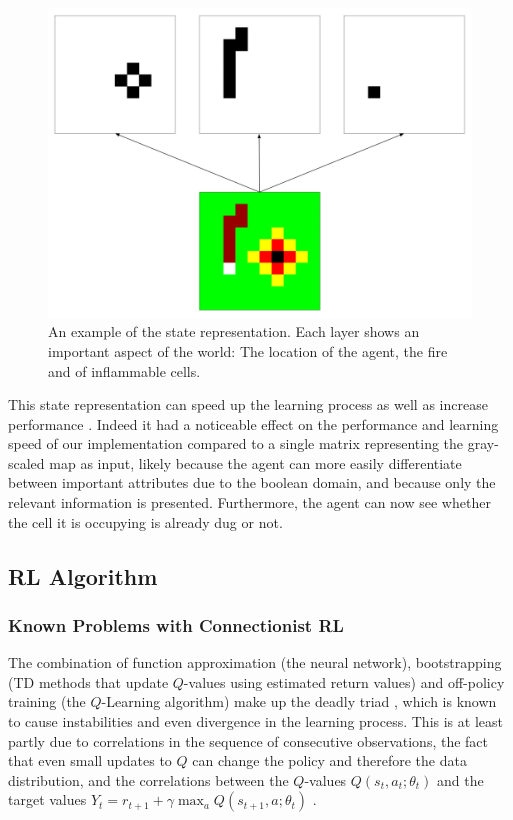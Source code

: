 \begin{figure}[h]
    \centering
    \includegraphics[width=1\linewidth]{img/State_Representation.png}
    \caption{An example of the state representation. Each layer shows an important aspect of the world: The location of the agent, the fire and of inflammable cells.}
    \label{fig:visiongrid}
\end{figure}

This state representation can speed up the learning process as well as increase performance \citep{knegt2018opponent}. Indeed it had a noticeable effect on the performance and learning speed of our implementation compared to a single matrix representing the gray-scaled map as input, likely because the agent can more easily differentiate between important attributes due to the boolean domain, and because only the relevant information is presented. Furthermore, the agent can now see whether the cell it is occupying is already dug or not.


\subsection{RL Algorithm}\label{sec:agent}

\subsubsection{Known Problems with Connectionist RL}\label{sec:problems}
The combination of function approximation (the neural network), bootstrapping (TD methods that update $Q$-values using estimated return values) and off-policy training (the $Q$-Learning algorithm) make up the deadly triad \citep{sutton_barto_2018}, which is known to cause instabilities and even divergence in the learning process. This is at least partly due to correlations in the sequence of consecutive observations, the fact that even small updates to $Q$ can change the policy and therefore the data distribution, and the correlations between the $Q$-values $Q(s_t, a_t; \theta_t)$ and the target values $Y_t = r_{t+1} + \gamma \max_a Q(s_{t+1}, a; \theta_t)$ \citep{mnih2015human}.

